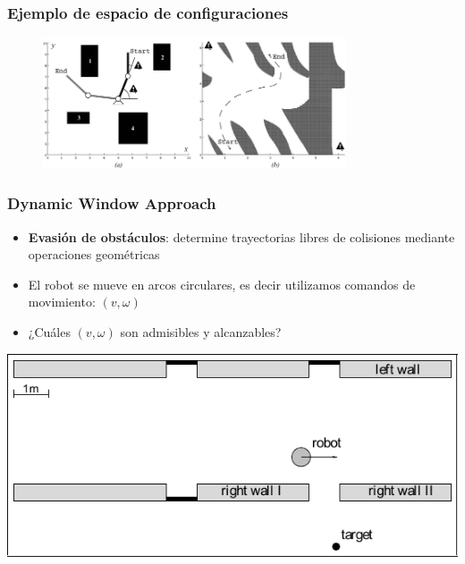 \begin{frame}
    \frametitle{Ejemplo de espacio de configuraciones}
    
    \begin{figure}[!h]
        \includegraphics[width=0.8\textwidth]{images/configuration_space_manipulator.pdf}
    \end{figure}
    
\end{frame}

\begin{frame}
	\frametitle{Dynamic Window Approach}
	
    \begin{itemize}
        \item \textbf{Evasión de obstáculos}: determine trayectorias libres de colisiones mediante operaciones geométricas
        \item El robot se mueve en arcos circulares, es decir utilizamos comandos de movimiento: $(v,\omega)$
        \item ¿Cuáles $(v,\omega)$ son admisibles y alcanzables?
    \end{itemize}
    
    \begin{center}
        \includegraphics[width=0.6\columnwidth]{images/dynamic_window_approach_robot_world.pdf}
    \end{center}
    
\end{frame}

